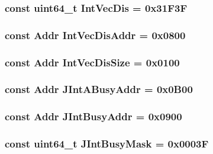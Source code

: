\label{iob_8hh_a5419690cae16575305ae94e77c2c8759}
\hypertarget{iob_8hh_aa8ed1e2f011322bfc744ae7cd511ba5d}{
\subsubsection[{IntVecDis}]{\setlength{\rightskip}{0pt plus 5cm}const uint64\_\-t {\bf IntVecDis} = 0x31F3F}}
\label{iob_8hh_aa8ed1e2f011322bfc744ae7cd511ba5d}
\hypertarget{iob_8hh_af3636c9da997038b8fb502374e7e47c1}{
\subsubsection[{IntVecDisAddr}]{\setlength{\rightskip}{0pt plus 5cm}const {\bf Addr} {\bf IntVecDisAddr} = 0x0800}}
\label{iob_8hh_af3636c9da997038b8fb502374e7e47c1}
\hypertarget{iob_8hh_aa4088245ff5c013bc95ea7082b99f8f3}{
\subsubsection[{IntVecDisSize}]{\setlength{\rightskip}{0pt plus 5cm}const {\bf Addr} {\bf IntVecDisSize} = 0x0100}}
\label{iob_8hh_aa4088245ff5c013bc95ea7082b99f8f3}
\hypertarget{iob_8hh_a026c3e790ce0ad35bf570cd7d753b0b1}{
\subsubsection[{JIntABusyAddr}]{\setlength{\rightskip}{0pt plus 5cm}const {\bf Addr} {\bf JIntABusyAddr} = 0x0B00}}
\label{iob_8hh_a026c3e790ce0ad35bf570cd7d753b0b1}
\hypertarget{iob_8hh_ac72e83848f2a94647997f7f15a481193}{
\subsubsection[{JIntBusyAddr}]{\setlength{\rightskip}{0pt plus 5cm}const {\bf Addr} {\bf JIntBusyAddr} = 0x0900}}
\label{iob_8hh_ac72e83848f2a94647997f7f15a481193}
\hypertarget{iob_8hh_a85c502f9e09ac6ac8295ba12e4149a45}{
\subsubsection[{JIntBusyMask}]{\setlength{\rightskip}{0pt plus 5cm}const uint64\_\-t {\bf JIntBusyMask} = 0x0003F}}
